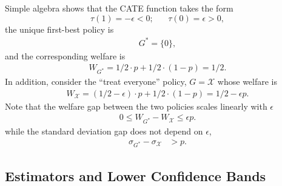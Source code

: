 \documentclass[12pt]{article}
\numberwithin{equation}{section}
\theoremstyle{plain}                         %
\theoremstyle{definition}                  %
\theoremstyle{remark}                      %
\begin{document}
Simple algebra shows that the CATE function takes the form
$$
\tau(1) = -\epsilon < 0; \;\;\;\;\;\; \tau(0) =\epsilon>0,
$$
the unique first-best policy is 
\begin{align}
\label{eq:fbb}
G^{*} = \{0\},
\end{align}
and the corresponding welfare is
\begin{align}
\label{eq:fbb2}
W_{G^{*}} = 1/2 \cdot p + 1/2 \cdot (1-p)=1/2.
\end{align}
In addition, consider  the ``treat everyone'' policy, $G=\mathcal{X}$ whose welfare is
\begin{align}
\label{eq:fbb3}
W_{\mathcal{X}} = (1/2 - \epsilon) \cdot p + 1/2 \cdot (1-p) = 1/2 - \epsilon p.
\end{align}
Note that the welfare gap between the two policies scales linearly with $\epsilon$ 
 \begin{align}
\label{eq:puzzlebias}
0 \leq W_{G^{*}}-W_{\mathcal{X}} \leq \epsilon p.
\end{align}
while the standard deviation gap does not depend on $\epsilon$,
\begin{align}
\label{eq:sigmalb2}
\sigma_{G^{*}}-\sigma_{\mathcal{X}} &> p. 
\end{align}

\subsection{Estimators and Lower Confidence Bands}
\label{sec:est_lcb}
\end{document}

